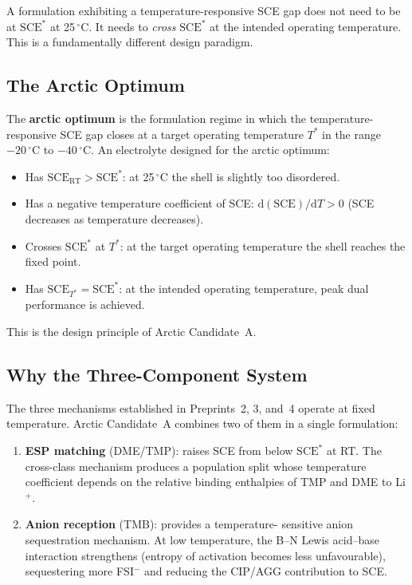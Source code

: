 \documentclass[11pt]{article}
\theoremstyle{plain}
\theoremstyle{definition}
\theoremstyle{remark}
\begin{document}
A formulation exhibiting a temperature-responsive SCE gap does not
need to be at $\mathrm{SCE}^{*}$ at 25\,$^\circ$C.  It needs to
\emph{cross} $\mathrm{SCE}^{*}$ at the intended operating temperature.
This is a fundamentally different design paradigm.

\subsection{The Arctic Optimum}

The \textbf{arctic optimum} is the formulation regime in which the
temperature-responsive SCE gap closes at a target operating
temperature $T^{*}$ in the range $-20\,^\circ$C to $-40\,^\circ$C.
An electrolyte designed for the arctic optimum:
\begin{itemize}[leftmargin=2em]
  \item Has $\mathrm{SCE}_\mathrm{RT} > \mathrm{SCE}^{*}$: at
        25\,$^\circ$C the shell is slightly too disordered.
  \item Has a negative temperature coefficient of SCE:
        $\mathrm{d}(\mathrm{SCE})/\mathrm{d}T > 0$
        (SCE decreases as temperature decreases).
  \item Crosses $\mathrm{SCE}^{*}$ at $T^{*}$: at the target
        operating temperature the shell reaches the fixed point.
  \item Has $\mathrm{SCE}_{T^*} = \mathrm{SCE}^{*}$: at the
        intended operating temperature, peak dual performance is
        achieved.
\end{itemize}

This is the design principle of Arctic Candidate~A.

\subsection{Why the Three-Component System}

The three mechanisms established in Preprints~2, 3, and~4 operate
at fixed temperature.  Arctic Candidate~A combines two of them in a
single formulation:

\begin{enumerate}[leftmargin=2em]
  \item \textbf{ESP matching} (DME/TMP): raises SCE from below
        $\mathrm{SCE}^{*}$ at RT.  The cross-class mechanism
        produces a population split whose temperature coefficient
        depends on the relative binding enthalpies of TMP and DME
        to Li$^+$.
  \item \textbf{Anion reception} (TMB): provides a temperature-
        sensitive anion sequestration mechanism.  At low temperature,
        the B--N Lewis acid--base interaction strengthens (entropy
        of activation becomes less unfavourable), sequestering more
        FSI$^-$ and reducing the CIP/AGG contribution to SCE.
\end{enumerate}
\end{document}
